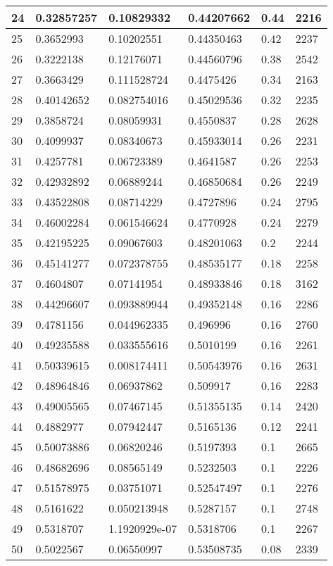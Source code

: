 \begin{longtable}{|l|l|l|l|l|l|}
24 & 0.32857257 & 0.10829332 & 0.44207662 & 0.44 & 2216 \\ \hline 
25 & 0.3652993 & 0.10202551 & 0.44350463 & 0.42 & 2237 \\ \hline 
26 & 0.3222138 & 0.12176071 & 0.44560796 & 0.38 & 2542 \\ \hline 
27 & 0.3663429 & 0.111528724 & 0.4475426 & 0.34 & 2163 \\ \hline 
28 & 0.40142652 & 0.082754016 & 0.45029536 & 0.32 & 2235 \\ \hline 
29 & 0.3858724 & 0.08059931 & 0.4550837 & 0.28 & 2628 \\ \hline 
30 & 0.4099937 & 0.08340673 & 0.45933014 & 0.26 & 2231 \\ \hline 
31 & 0.4257781 & 0.06723389 & 0.4641587 & 0.26 & 2253 \\ \hline 
32 & 0.42932892 & 0.06889244 & 0.46850684 & 0.26 & 2249 \\ \hline 
33 & 0.43522808 & 0.08714229 & 0.4727896 & 0.24 & 2795 \\ \hline 
34 & 0.46002284 & 0.061546624 & 0.4770928 & 0.24 & 2279 \\ \hline 
35 & 0.42195225 & 0.09067603 & 0.48201063 & 0.2 & 2244 \\ \hline 
36 & 0.45141277 & 0.072378755 & 0.48535177 & 0.18 & 2258 \\ \hline 
37 & 0.4604807 & 0.07141954 & 0.48933846 & 0.18 & 3162 \\ \hline 
38 & 0.44296607 & 0.093889944 & 0.49352148 & 0.16 & 2286 \\ \hline 
39 & 0.4781156 & 0.044962335 & 0.496996 & 0.16 & 2760 \\ \hline 
40 & 0.49235588 & 0.033555616 & 0.5010199 & 0.16 & 2261 \\ \hline 
41 & 0.50339615 & 0.008174411 & 0.50543976 & 0.16 & 2631 \\ \hline 
42 & 0.48964846 & 0.06937862 & 0.509917 & 0.16 & 2283 \\ \hline 
43 & 0.49005565 & 0.07467145 & 0.51355135 & 0.14 & 2420 \\ \hline 
44 & 0.4882977 & 0.07942447 & 0.5165136 & 0.12 & 2241 \\ \hline 
45 & 0.50073886 & 0.06820246 & 0.5197393 & 0.1 & 2665 \\ \hline 
46 & 0.48682696 & 0.08565149 & 0.5232503 & 0.1 & 2226 \\ \hline 
47 & 0.51578975 & 0.03751071 & 0.52547497 & 0.1 & 2276 \\ \hline 
48 & 0.5161622 & 0.050213948 & 0.5287157 & 0.1 & 2748 \\ \hline 
49 & 0.5318707 & 1.1920929e-07 & 0.5318706 & 0.1 & 2267 \\ \hline 
50 & 0.5022567 & 0.06550997 & 0.53508735 & 0.08 & 2339 \\ \hline 
\end{longtable}